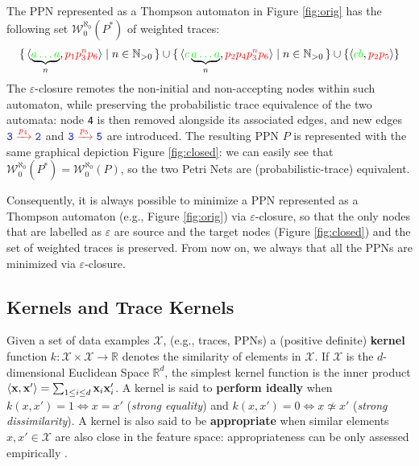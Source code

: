 \begin{example}
The PPN represented as a Thompson automaton in Figure \ref{fig:orig} has the following set $\mathcal{W}_0^{\aleph_0}(P^*)$ of weighted traces:
$$\set{\braket{\underbrace{\color{green}a\dots a}_{n},{\color{red}p_1p_3^np_6}}|n\in \mathbb{N}_{>0}}\cup \set{\braket{{\color{green}c}\underbrace{\color{green}a\dots a}_{n},{\color{red}p_2p_4p_3^np_6}}|n\in \mathbb{N}_{>0}}\cup\{\braket{{\color{green}cb},{\color{red}p_2p_5}}\}$$
The $\varepsilon$-closure remotes the non-initial and non-accepting nodes within such automaton, while preserving the probabilistic trace equivalence of the two automata: node \texttt{\color{blue}4} is then removed alongside its associated edges, and new edges $\texttt{\color{blue}3}\xrightarrow{\color{red}p_4}\texttt{\color{blue}2}$ and $\texttt{\color{blue}3}\xrightarrow{\color{red}p_5}\texttt{\color{blue}5}$ are introduced. The resulting PPN $P$ is represented with the same graphical depiction Figure \ref{fig:closed}: 
we can easily see that $\mathcal{W}_0^{\aleph_0}(P^*)=\mathcal{W}_0^{\aleph_0}(P)$, so the two Petri Nets are (probabilistic-trace) equivalent.
\end{example}

Consequently, it is always possible to minimize a PPN represented as a Thompson automaton (e.g., Figure \ref{fig:orig}) via $\varepsilon$-closure, so that the only nodes that are labelled as $\varepsilon$ are source and the target nodes (Figure \ref{fig:closed}) and the set of weighted traces is preserved. From now on, we always that all the PPNs are minimized via $\varepsilon$-closure.


\subsection{Kernels and Trace Kernels}\label{subsec:katk}
Given a set of data examples $\mathcal{X}$, (e.g., traces, PPNs) a (positive definite) \textbf{kernel} function $k\colon \mathcal{X}\times \mathcal{X}\to \mathbb{R}$ denotes the similarity of elements in $\mathcal{X}$. If $\mathcal{X}$ is the $d$-dimensional Euclidean Space $\mathbb{R}^d$, the simplest kernel function is the inner product $\Braket{\mathbf{x},\mathbf{x}'}=\sum_{1\leq i\leq d}\mathbf{x}_i\mathbf{x}'_i$. 
A kernel is said to \textbf{perform ideally} \cite{Gartner03} when $k(x,x')=1\Leftrightarrow x=x'$ (\textit{strong equality}) and $k(x,x')=0\Leftrightarrow x\not\simeq x'$ (\textit{strong dissimilarity}). A kernel is also said to be \textbf{appropriate} when similar elements $x,x'\in\mathcal{X}$ are also close in the feature space: appropriateness can be only assessed  empirically \cite{Gartner03}.

